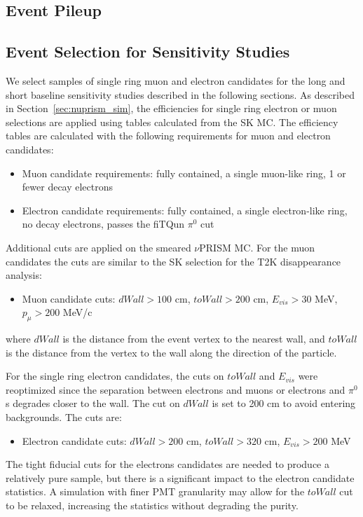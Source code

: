 

\subsection{Event Pileup } \label{sec:nuprism_pileup} %



\subsection{Event Selection for Sensitivity Studies}
We select samples of single ring muon and electron candidates for the long and short baseline sensitivity studies described in the following sections.  
As described in Section~\ref{sec:nuprism_sim}, the efficiencies for single ring electron or muon selections are applied using tables calculated from the SK MC.  
The efficiency tables are calculated with the following requirements for muon and electron candidates:
\begin{itemize}
\item Muon candidate requirements: fully contained, a single muon-like ring, 1 or fewer decay electrons
\item Electron candidate requirements: fully contained, a single electron-like ring, no decay electrons, passes the fiTQun $\pi^{0}$ cut
\end{itemize}
Additional cuts are applied on the smeared $\nu$PRISM MC.  For the muon candidates the cuts are similar to the SK selection for the T2K disappearance analysis:
\begin{itemize}
\item Muon candidate cuts: $dWall>100$ cm, $toWall>200$ cm, $E_{vis}>30$ MeV, $p_{\mu}>200$ MeV/c
\end{itemize}
where $dWall$ is the distance from the event vertex to the nearest wall, and $toWall$ is the distance from the vertex to the wall along the direction of the particle.

For the single ring electron candidates, the cuts on $toWall$ and $E_{vis}$ were reoptimized since the separation between electrons and muons or electrons
and $\pi^{0}$s degrades closer to the wall.  The cut on $dWall$ is set to 200 cm to avoid entering backgrounds.  The 
cuts are:
\begin{itemize}
\item Electron candidate cuts: $dWall>200$ cm, $toWall>320$ cm, $E_{vis}>200$ MeV
\end{itemize}
The tight fiducial cuts for the electrons candidates are needed to produce a relatively pure sample, but there is a significant impact to the electron candidate statistics.
A simulation with finer PMT granularity may allow for the $toWall$ cut to be relaxed, increasing the statistics without degrading the purity.


